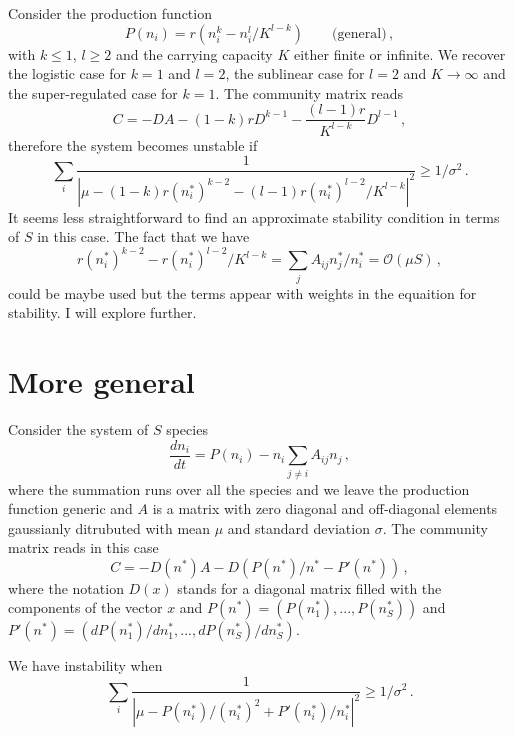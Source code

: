 \documentclass[10pt]{article}
\begin{document}
Consider the production function
\begin{equation}
    P(n_i) = r\left(n_i^k - n_i^l/K^{l-k}\right) \qquad \textrm{(general)} \, ,
\end{equation}
with $k\leq1$, $l\geq2$ and the carrying capacity $K$ either finite or infinite.
We recover the logistic case for $k=1$ and $l=2$, the sublinear
case for $l=2$ and $K\to\infty$ and the super-regulated case for $k=1$.
The community matrix reads
\begin{equation}
    C =  -DA -(1-k)rD^{k-1} -\frac{(l-1)r}{K^{l-k}}D^{l-1} \, ,
\end{equation}
therefore the system becomes unstable if 
\begin{equation}
    \sum_i \frac{1}{|\mu -(1-k)r(n_i^*)^{k-2} -(l-1)r(n_i^*)^{l-2}/K^{l-k}|^2}\geq 1/\sigma^2 \, .
\end{equation}
It seems less straightforward to find an approximate
stability condition in terms of $S$ in this case.
The fact that we have
\begin{equation}
    r(n_i^*)^{k-2} - r(n_i^*)^{l-2}/K^{l-k} = \sum_j A_{ij}n_j^*/n_i^* = \mathcal{O}(\mu S) \, ,
\end{equation}
could be maybe used but the terms appear with weights in the equaition for stability.
I will explore further.

\section{More general}
Consider the system of $S$ species
\begin{equation}
    \frac{dn_i}{dt} = P(n_i) - n_i\sum_{j\neq i}A_{ij}n_j \, ,
\end{equation}
where the summation runs over all the species and we leave the production function generic
and $A$ is a matrix with zero diagonal and off-diagonal elements gaussianly
ditrubuted with mean $\mu$ and standard deviation $\sigma$.
The community matrix reads in this case
\begin{equation}
    C = -D(n^*)A - D(P(n^*)/n^*-P'(n^*)) \, ,
\end{equation}
where the notation $D(x)$ stands for a diagonal matrix filled 
with the components of the vector
$x$ and $P(n^*)=(P(n_1^*), ..., P(n_S^*))$ and $P'(n^*)=(dP(n_1^*)/dn_1^*, ..., dP(n_S^*)/dn_S^*)$.

We have instability when
\begin{equation}
    \sum_i \frac{1}{|\mu -P(n_i^*)/(n_i^*)^2+P'(n_i^*)/n_i^*|^2}\geq 1/\sigma^2 \, .
\end{equation}
\end{document}

